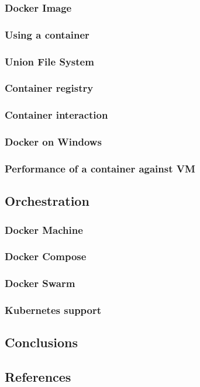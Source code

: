 \subsubsection{Docker Image}
\subsubsection{Using a container}
\subsubsection{Union File System}
\subsubsection{Container registry}
\subsubsection{Container interaction}
\subsubsection{Docker on Windows}
\subsubsection{Performance of a container against VM}
\subsection{Orchestration}
\subsubsection{Docker Machine}
\subsubsection{Docker Compose}
\subsubsection{Docker Swarm}
\subsubsection{Kubernetes support}
\subsection{Conclusions}
\subsection{References}

